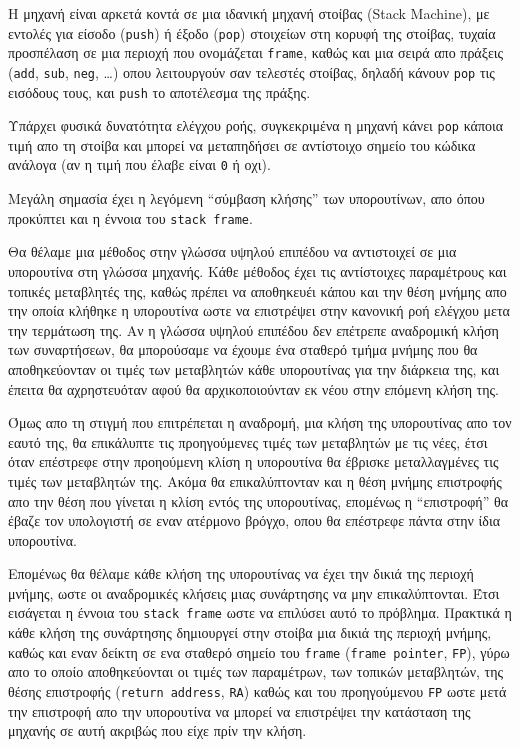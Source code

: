 \documentclass[a4paper,11pt]{article}
\newcommand{\eng}[1]{\foreignlanguage{english}{#1}}
\newcommand{\tech}[1]{\foreignlanguage{english}{\texttt{#1}}}
\begin{document}
Η μηχανή είναι αρκετά κοντά σε μια ιδανική μηχανή στοίβας (\eng{Stack Machine}), 
με εντολές για είσοδο (\tech{push}) ή έξοδο (\tech{pop}) στοιχείων στη κορυφή της στοίβας, 
τυχαία προσπέλαση σε μια περιοχή που ονομάζεται \tech{frame}, καθώς και μια σειρά απο πράξεις 
(\tech{add}, \tech{sub}, \tech{neg}, \dots) οπου λειτουργούν σαν τελεστές στοίβας, 
δηλαδή κάνουν \tech{pop} τις εισόδους τους, και \tech{push} το αποτέλεσμα της πράξης. 

Υπάρχει φυσικά δυνατότητα ελέγχου ροής, συγκεκριμένα η μηχανή κάνει \tech{pop} κάποια τιμή 
απο τη στοίβα και μπορεί να μεταπηδήσει σε αντίστοιχο σημείο του κώδικα ανάλογα (αν η τιμή 
που έλαβε είναι \tech{0} ή οχι).

Μεγάλη σημασία έχει η λεγόμενη \enquote{σύμβαση κλήσης} των υπορουτίνων, απο όπου προκύπτει
και η έννοια του \tech{stack frame}. 

Θα θέλαμε μια μέθοδος στην γλώσσα υψηλού επιπέδου να 
αντιστοιχεί σε μια υπορουτίνα στη γλώσσα μηχανής. Κάθε μέθοδος έχει τις αντίστοιχες
παραμέτρους και τοπικές μεταβλητές της, καθώς πρέπει να αποθηκευέι κάπου και την θέση
μνήμης απο την οποία κλήθηκε η υπορουτίνα ωστε να επιστρέψει στην κανονική ροή ελέγχου μετα
την τερμάτωση της. Αν η γλώσσα υψηλού επιπέδου δεν επέτρεπε αναδρομική κλήση των συναρτήσεων,
θα μπορούσαμε να έχουμε ένα σταθερό τμήμα μνήμης που θα αποθηκεύονταν οι τιμές των μεταβλητών 
κάθε υπορουτίνας για την διάρκεια της, και έπειτα θα αχρηστευόταν αφού θα αρχικοποιούνταν 
εκ νέου στην επόμενη κλήση της. 

Όμως απο τη στιγμή που επιτρέπεται η αναδρομή, μια κλήση 
της υπορουτίνας απο τον εαυτό της, θα επικάλυπτε τις προηγούμενες τιμές των μεταβλητών με τις
νέες, έτσι όταν επέστρεφε στην προηούμενη κλίση η υπορουτίνα θα έβρισκε μεταλλαγμένες τις 
τιμές των μεταβλητών της. Ακόμα θα επικαλύπτονταν και η θέση μνήμης επιστροφής απο την θέση
που γίνεται η κλίση εντός της υπορουτίνας, επομένως η \enquote{επιστροφή} θα έβαζε τον 
υπολογιστή σε εναν ατέρμονο βρόγχο, οπου θα επέστρεφε πάντα στην ίδια υπορουτίνα.

Επομένως θα θέλαμε κάθε κλήση της υπορουτίνας να έχει την δικιά της περιοχή μνήμης, ωστε
οι αναδρομικές κλήσεις μιας συνάρτησης να μην επικαλύπτονται. Έτσι εισάγεται η έννοια του
\tech{stack frame} ωστε να επιλύσει αυτό το πρόβλημα. Πρακτικά η κάθε κλήση της συνάρτησης
δημιουργεί στην στοίβα μια δικιά της περιοχή μνήμης, καθώς και εναν δείκτη σε ενα σταθερό 
σημείο του \tech{frame} (\tech{frame pointer}, \tech{FP}), γύρω απο το οποίο αποθηκεύονται 
οι τιμές των παραμέτρων, των τοπικών μεταβλητών, της θέσης επιστροφής 
(\tech{return address}, \tech{RA}) καθώς και του προηγούμενου \tech{FP} ωστε μετά την
επιστροφή απο την υπορουτίνα να μπορεί να επιστρέψει την κατάσταση της μηχανής σε αυτή
ακριβώς που είχε πρίν την κλήση.
\end{document}
